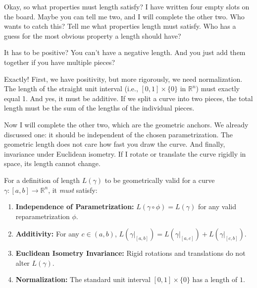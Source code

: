 \begin{spoken-clean}[12:30 - 14:15]
Okay, so what properties must length satisfy? I have written four empty slots on the board. Maybe you can tell me two, and I will complete the other two. Who wants to catch this? Tell me what properties length must satisfy. Who has a guess for the most obvious property a length should have?
\end{spoken-clean}

\begin{student-question}
It has to be positive? You can't have a negative length. And you just add them together if you have multiple pieces?
\end{student-question}

\begin{spoken-clean}[14:15 - 17:30]
Exactly! First, we have positivity, but more rigorously, we need normalization. The length of the straight unit interval (i.e., $[0,1] \times \{0\}$ in $\mathbb{R}^n$) must exactly equal 1. And yes, it must be additive. If we split a curve into two pieces, the total length must be the sum of the lengths of the individual pieces. 

Now I will complete the other two, which are the geometric anchors. We already discussed one: it should be independent of the chosen parametrization. The geometric length does not care how fast you draw the curve. And finally, invariance under Euclidean isometry. If I rotate or translate the curve rigidly in space, its length cannot change.
\end{spoken-clean}

\begin{orange-formula}
\begin{definition}
For a definition of length $L(\gamma)$ to be geometrically valid for a curve $\gamma: [a, b] \to \mathbb{R}^n$, it \textit{must} satisfy:
\begin{enumerate}
    \item \textbf{Independence of Parametrization:} $L(\gamma \circ \phi) = L(\gamma)$ for any valid reparametrization $\phi$.
    \item \textbf{Additivity:} For any $c \in (a, b)$, $L(\gamma|_{[a, b]}) = L(\gamma|_{[a, c]}) + L(\gamma|_{[c, b]})$.
    \item \textbf{Euclidean Isometry Invariance:} Rigid rotations and translations do not alter $L(\gamma)$.
    \item \textbf{Normalization:} The standard unit interval $[0,1] \times \{0\}$ has a length of $1$.
\end{enumerate}
\end{definition}
\end{orange-formula}

